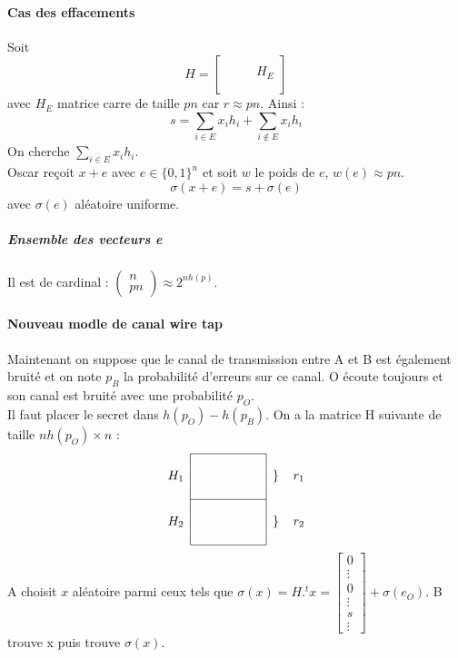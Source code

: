\documentclass[12pt,a4paper]{report}
\begin{document}
\paragraph{Cas des effacements\\}
Soit 
$$ H = \begin{bmatrix}
& & &  \\
& & & H_E  \\
& & & \\
\end{bmatrix}
$$
avec $H_E$ matrice carre de taille $pn$ car $r \approx pn $.
Ainsi :
$$ s= \sum_{i\in E} x_i h_i + \sum_{i \not \in E} x_i h_i $$
On cherche $\displaystyle  \sum_{i\in E} x_i h_i $. \\
Oscar reçoit $x+e$ avec $ e \in \{0,1\}^n$ et soit $w$ le poids de $e$, $w(e) \approx pn $.\\
$$ \sigma(x+e) = s + \sigma(e) $$
avec $\sigma(e)$ aléatoire uniforme.
\subparagraph{Ensemble des vecteurs e\\}
Il est de cardinal : $\displaystyle \left( \begin{array}{c} n \\ pn \end{array} \right) \approx 2^{nh(p)}$.
\paragraph{Nouveau modle de canal wire tap\\}
Maintenant on suppose que le canal de transmission entre A et B est également bruité et on note $p_B$ la probabilité d'erreurs sur ce canal. O écoute toujours et son canal est bruité avec une probabilité $p_O$.\\
Il faut placer le secret dans $h(p_O) - h(p_B) $.
On a la matrice H suivante de taille $nh(p_O) \times n$ :
$$ \begin{array}{c|cccccc|ll}
\cline{2-7}
& & & & & & & \\
H_1  & & & & & & & \left\} \right. & r_1\\
& & & & &  & & & \\\cline{2-7}
& & & & & &  & & \\
H_2  & & & & & & & \left\}  \right.& r_2 \\
& & & & & & & & \\\cline{2-7}
\end{array} $$
A choisit $x$ aléatoire parmi ceux tels que $\sigma(x) = H .^tx = \begin{bmatrix} 0 \\ \vdots \\ 0 \\\vdots \\ s \\ \vdots \end{bmatrix} + \sigma(e_O) $. B trouve x puis trouve $\sigma(x)$.
\end{document}
